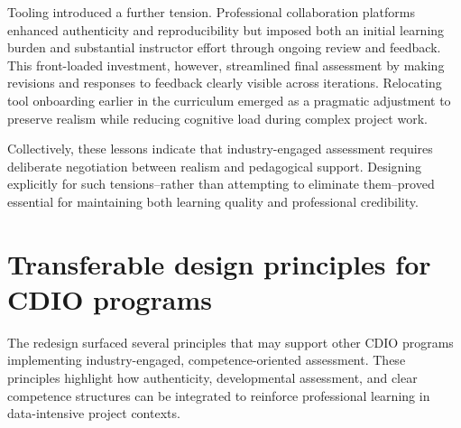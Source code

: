 Tooling introduced a further tension. Professional collaboration platforms enhanced authenticity and reproducibility but imposed both an initial learning burden and substantial instructor effort through ongoing review and feedback. This front-loaded investment, however, streamlined final assessment by making revisions and responses to feedback clearly visible across iterations. Relocating tool onboarding earlier in the curriculum emerged as a pragmatic adjustment to preserve realism while reducing cognitive load during complex project work.


Collectively, these lessons indicate that industry-engaged assessment requires deliberate negotiation between realism and pedagogical support. Designing explicitly for such tensions--rather than attempting to eliminate them--proved essential for maintaining both learning quality and professional credibility.

\section{Transferable design principles for CDIO programs}
The redesign surfaced several principles that may support other CDIO programs implementing industry-engaged, competence-oriented assessment. These principles highlight how authenticity, developmental assessment, and clear competence structures can be integrated to reinforce professional learning in data-intensive project contexts.

